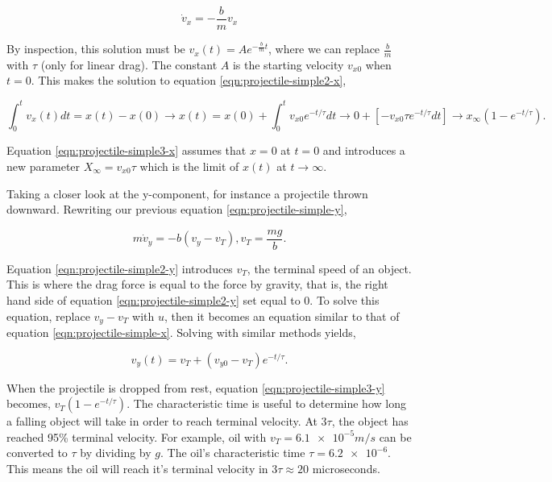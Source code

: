 \begin{equation}
    \label{eqn:projectile-simple2-x}
    \dot v_x = -\frac{b}{m}v_x
\end{equation}

\noindent By inspection, this solution must be $v_x(t) = Ae^{-\frac{b}{m}t}$, where we can replace $\frac{b}{m}$ with $\tau$ (only for linear drag). The constant $A$ is the starting velocity $v_{x0}$ when $t=0$. This makes the solution to equation \ref{eqn:projectile-simple2-x},

\begin{equation}
\label{eqn:projectile-simple3-x}
    \int_0^t v_x(t) dt = x(t) - x(0) \rightarrow x(t) = x(0) + \int^t_0 v_{x0}e^{-t/\tau} dt \rightarrow 0 + [-v_{x0} \tau e^{-t/\tau} dt] \rightarrow x_\infty(1-e^{-t/\tau}).
\end{equation}

Equation \ref{eqn:projectile-simple3-x} assumes that $x=0$ at $t=0$ and introduces a new parameter $X_\infty = v_{x0}\tau$ which is the limit of $x(t)$ at $t \rightarrow \infty$.

Taking a closer look at the y-component, for instance a projectile thrown downward. Rewriting our previous equation \ref{eqn:projectile-simple-y},

\begin{equation}
    \label{eqn:projectile-simple2-y}
    m\dot v_y = -b(v_y - v_T), v_T = \frac{mg}{b}.
\end{equation}

Equation \ref{eqn:projectile-simple2-y} introduces $v_T$, the terminal speed of an object. This is where the drag force is equal to the force by gravity, that is, the right hand side of equation \ref{eqn:projectile-simple2-y} set equal to $0$. To solve this equation, replace $v_y - v_T$ with $u$, then it becomes an equation similar to that of equation \ref{eqn:projectile-simple-x}. Solving with similar methods yields,

\begin{equation}
    \label{eqn:projectile-simple3-y}
    v_y(t) = v_T + (v_{y0} - v_T)e^{-t/\tau}.
\end{equation}

When the projectile is dropped from rest, equation \ref{eqn:projectile-simple3-y} becomes, $v_T(1-e^{-t/\tau})$. The characteristic time is useful to determine how long a falling object will take in order to reach terminal velocity. At $3\tau$, the object has reached 95\% terminal velocity. For example, oil with $v_T = \num{6.1e-5}m/s$  can be converted to $\tau$ by dividing by $g$. The oil's characteristic time $\tau = \num{6.2e-6}$. This means the oil will reach it's terminal velocity in $3\tau \approx 20$ microseconds.

